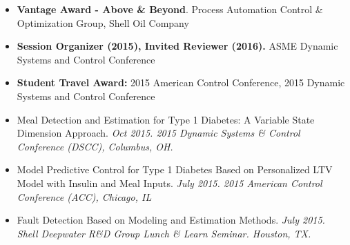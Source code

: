 \documentclass[10pt,a4paper]{article}
\begin{document}
  
  \spacedhrule{0.5em}{-0.8em}
  \begin{itemize}
  \item \textbf{Vantage Award - Above \& Beyond}. Process
    Automation Control \& Optimization Group, Shell Oil Company
  \item \textbf{Session Organizer (2015), Invited Reviewer (2016).} ASME Dynamic Systems
    and Control Conference
  \item \textbf{Student Travel Award:} 2015 American Control Conference, 2015 Dynamic Systems and Control Conference
  \end{itemize}


  

  \spacedhrule{0.5em}{-0.8em}
  \begin{itemize}
  \item Meal Detection and Estimation for Type 1 Diabetes: A
      Variable State Dimension Approach. \textit{Oct 2015. 2015 Dynamic Systems \& Control
      Conference (DSCC), Columbus, OH.}
  \item Model Predictive Control for Type 1 Diabetes Based on Personalized LTV
    Model with Insulin and Meal Inputs. \textit{July 2015. 2015 American Control
      Conference (ACC), Chicago, IL} 
  \item Fault Detection Based on Modeling and Estimation Methods. \textit{July 2015.
    Shell Deepwater R\&D Group Lunch \& Learn Seminar. Houston, TX.}
  \end{itemize}
\end{document}
